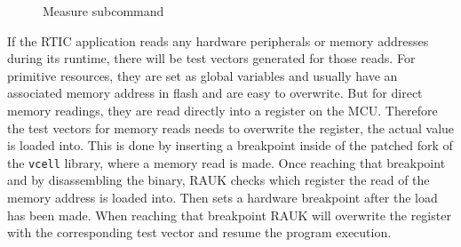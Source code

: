 \begin{figure}
    \centering
    \caption{Measure subcommand}
    \label{fig:measureparts}
\end{figure}

If the RTIC application reads any hardware peripherals or memory addresses
during its runtime, there will be test vectors generated for those reads. For
primitive resources, they are set as global variables and usually have an
associated memory address in flash and are easy to overwrite. But for direct
memory readings, they are read directly into a register on the MCU. Therefore
the test vectors for memory reads needs to overwrite the register, the actual
value is loaded into. This is done by inserting a breakpoint inside of the
patched fork of the \texttt{vcell} library, where a memory read is made. Once
reaching that breakpoint and by disassembling the binary, RAUK checks which
register the read of the memory address is loaded into. Then sets a hardware
breakpoint after the load has been made. When reaching that breakpoint RAUK
will overwrite the register with the corresponding test vector and resume the
program execution.

